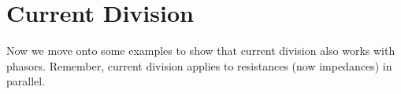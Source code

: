 \documentclass{handout}
\begin{document}

\newpage
\clearpage
\pagebreak

\section{Current Division}
Now we move onto some examples to show that current division also works with phasors.  Remember, current division applies to resistances (now impedances) in parallel.
\end{document}
